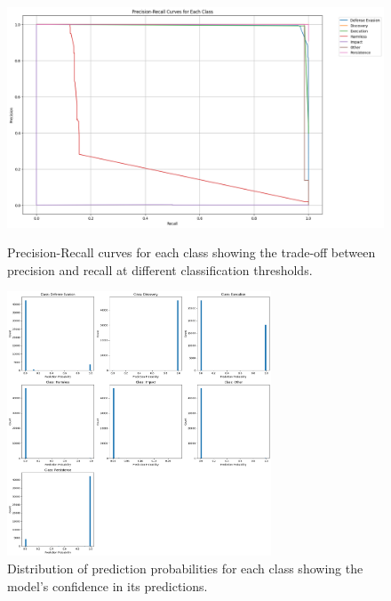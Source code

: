         \begin{figure}[h]
            \centering
            \begin{minipage}[c]{0.47\textwidth}
                \centering
                \includegraphics[width=\textwidth]{../figures/plots/section4/precision_recall_curves.png}
                \caption{Precision-Recall curves for each class showing the trade-off between precision and recall at different classification thresholds.}
                \label{fig:pr_curves}
            \end{minipage}
            \hfill
            \begin{minipage}[c]{0.47\textwidth}
                \centering
                \includegraphics[width=0.7\textwidth]{../figures/plots/section4/probability_histograms.png}
                \caption{Distribution of prediction probabilities for each class showing the model's confidence in its predictions.}
                \label{fig:pred_prob} 
            \end{minipage}
        \end{figure}
        
